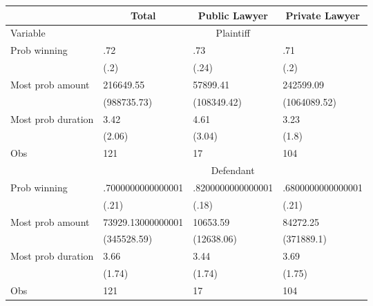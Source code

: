 \begin{tabular}{llll}
      & \multicolumn{1}{c}{Total} & \multicolumn{1}{c}{Public Lawyer} & \multicolumn{1}{c}{Private Lawyer} \\
\midrule
Variable & \multicolumn{3}{c}{Plaintiff} \\
\midrule
\midrule
Prob winning & .72   & .73   & .71 \\
      & (.2)  & (.24) & (.2) \\
Most prob amount & 216649.55 & 57899.41 & 242599.09 \\
      & (988735.73) & (108349.42) & (1064089.52) \\
Most prob duration & 3.42  & 4.61  & 3.23 \\
      & (2.06) & (3.04) & (1.8) \\
Obs   & 121   & 17    & 104 \\
\cmidrule{2-4}      & \multicolumn{3}{c}{Defendant} \\
\cmidrule{2-4}Prob winning & .7000000000000001 & .8200000000000001 & .6800000000000001 \\
      & (.21) & (.18) & (.21) \\
Most prob amount & 73929.13000000001 & 10653.59 & 84272.25 \\
      & (345528.59) & (12638.06) & (371889.1) \\
Most prob duration & 3.66  & 3.44  & 3.69 \\
      & (1.74) & (1.74) & (1.75) \\
Obs   & 121   & 17    & 104 \\
\bottomrule
\end{tabular}%
